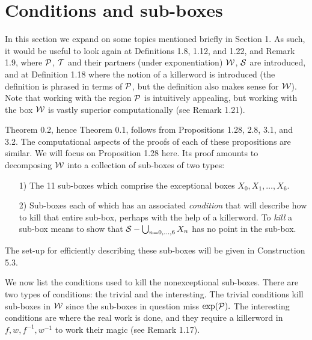  
\section{Conditions and sub-boxes}
  
In this section we expand on some topics mentioned briefly in Section 1.  As such, it would be useful to look again at
Definitions 1.8, 1.12, and 1.22, and Remark 1.9, where ${\cal P}$, ${\cal T}$ and their partners (under exponentiation)
${\cal W}$, ${\cal S}$ are introduced, and at Definition 1.18 where the notion of a killerword is introduced (the
definition is phrased in terms of ${\cal P}$, but the definition also makes sense for ${\cal W}$).  Note that working with
the region
${\cal P}$ is intuitively appealing, but working with the box ${\cal W}$ is vastly superior computationally (see Remark
1.21).

Theorem 0.2, hence Theorem 0.1, follows from Propositions 1.28, 2.8, 
3.1, and 3.2.  The computational aspects of the proofs of each of these propositions are similar.  We will focus on Proposition 1.28 here.
Its proof   amounts to decomposing 
 ${\cal W}$ into a collection of sub-boxes of two types:
\begin{itemize}
\item[1)]   The 11 sub-boxes which comprise the 
exceptional boxes $X_0, X_1, \ldots, X_6.$ 

\item[2)]   Sub-boxes each of which has an associated {\it condition} that will describe how to kill that entire sub-box,
perhaps with the help of a killerword.  To {\it kill} a sub-box means to show that 
${\cal S} - \bigcup_{n = 0,\dots, 6} X_n$ has no point in the sub-box. 
\end{itemize}
\noindent The set-up for efficiently describing these sub-boxes will be given in Construction 5.3. 
 

We now list the conditions used to kill the nonexceptional sub-boxes.  There are two types of conditions: the trivial and
the interesting.  The trivial conditions kill sub-boxes in ${\cal W}$ since the sub-boxes in question miss 
$\exp({\cal P}).$  The interesting conditions are where the real work is done, and they require a killerword in $f, w,
f^{-1}, w^{-1}$ to work their magic (see Remark 1.17).


